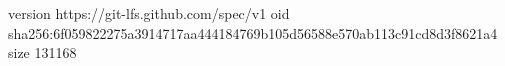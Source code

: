 version https://git-lfs.github.com/spec/v1
oid sha256:6f059822275a3914717aa444184769b105d56588e570ab113c91cd8d3f8621a4
size 131168
